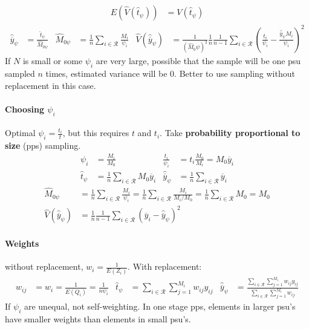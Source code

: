 \documentclass[landscape]{article}
\begin{document}
\begin{multicols*}{3}
\begin{align*}
  \\ E(\hat{V}(\hat{t}_{\psi})) & = V(\hat{t}_{\psi})
\end{align*}
\begin{align*}
  \hat{\overline{y}}_{\psi} & = \frac{\hat{t}_{\psi}}{\hat{M}_{0 \psi}} & \hat{M}_{0\psi} &= \frac{1}{n} \sum_{i \in \mathcal{R}} \frac{M_i}{\psi_i}
  & \hat{V} (\hat{\overline{y}}_{\psi}) & = \frac{1}{(\hat{M}_0\psi)^2} \frac{1}{n} \frac{1}{n-1} \sum_{i \in \mathcal{R}} \left(\frac{t_i}{\psi_i} - \frac{\hat{\overline{y}}_\psi M_i}{\psi_i}\right)^2
\end{align*}
If $N$ is small or some $\psi_i$ are very large, possible that the
sample will be one psu sampled $n$ times, estimated variance will be
$0$. Better to use sampling without replacement in this case.
\paragraph{Choosing $\psi_i$}
Optimal $\psi_i = \frac{t_i}{t}$, but this requires $t$ and
$t_i$. Take \textbf{probability proportional to size} (pps) sampling.
\begin{align*}
  \psi_i & = \frac{M_i}{M_0}
  & \frac{t_i}{\psi_i} & = t_i\frac{M_0}{M_i} = M_0 \overline{y}_i
  \\ \hat{t}_{\psi} & = \frac{1}{n} \sum_{i \in \mathcal{R}} M_0 \overline{y}_i
  & \hat{\overline{y}}_\psi & = \frac{1}{n}\sum_{i \in \mathcal{R}} \overline{y}_i
\end{align*}
\begin{align*}
  \hat{M}_{0\psi} & = \frac{1}{n} \sum_{i \in \mathcal{R}} \frac{M_i}{\psi_i} = \frac{1}{n} \sum_{i \in \mathcal{R}} \frac{M_i}{M_i/M_0} = \frac{1}{n} \sum_{i \in \mathcal{R}}M_0 = M_0
  \\ \hat{V}(\hat{\overline{y}}_{\psi}) & = \frac{1}{n} \frac{1}{n-1} \sum_{i \in \mathcal{R}} (\overline{y}_i - \hat{\overline{y}}_{\psi})^2
\end{align*}
\paragraph{Weights} without replacement, $w_i =
\frac{1}{E(Z_i)}$. With replacement:
\begin{align*}
  w_{ij} & = w_i = \frac{1}{E(Q_i)} = \frac{1}{n\psi_i}
  & \hat{t}_{\psi} & = \sum_{i \in \mathcal{R}} \sum_{j = 1}^{M_i}w_{ij}y_{ij}
  & \hat{\overline{y}}_{\psi} & = \frac{\sum_{i \in \mathcal{R}}\sum_{j=1}^{M_i}w_{ij}y_{ij}}{\sum_{i \in \mathcal{R}}\sum_{j=1}^{M_i}w_{ij}}
\end{align*}
If $\psi_i$ are unequal, not self-weighting. In one stage pps, elements in
larger psu's have smaller weights than elements in small psu's.

\end{multicols*}
\end{document}
